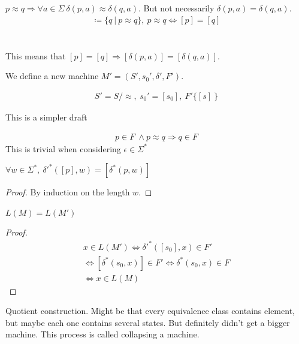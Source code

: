 \documentclass[../598comp.tex]{subfiles}
\begin{document}
\begin{lemma}
  $p \approx q \Rightarrow \forall a \in \Sigma \ \delta(p, a) \approx \delta(q, a)$. But not necessarily $\delta(p, a) = \delta(q, a)$.
  \begin{gather*}
    [p] \coloneqq \{q \ | \ p \approx q\}, \ p \approx q \Leftrightarrow [p] = [q]
  \end{gather*} 
  \\\\
  This means that $[p] = [q] \Rightarrow [\delta(p, a)] = [\delta(q, a)]$.
\end{lemma} 

We define a new machine $M' = (S', s_0', \delta', F')$. 

\begin{gather*}
  S' = S / \approx, \ s_0' = [s_0], \ F'\{[s] \ \} %
\end{gather*} 


This is a simpler draft

\begin{lemma}
  \begin{gather*}
   p \in F \ \wedge p \approx q \Rightarrow q \in F
  \end{gather*} 
  This is trivial when considering $\epsilon \in \Sigma^*$
\end{lemma} 

\begin{lemma}
  $\forall w \in \Sigma^*, \ \delta'^*([p], w) = [\delta^*(p, w)]$
  \begin{proof}
    By induction on the length $w$.
  \end{proof}
\end{lemma} 

\begin{theorem}
  $L(M) = L(M')$
  \begin{proof}
    \begin{gather*}
      x \in L(M') \Leftrightarrow \delta'^*([s_0], x) \in F' \\
      \Leftrightarrow [\delta^*(s_0, x)] \in F' \Leftrightarrow \delta^*(s_0, x) \in F \\
      \Leftrightarrow x \in L(M)
    \end{gather*} 
  \end{proof} 
  Quotient construction. Might be that every equivalence class contains element, but maybe each one contains several states. But definitely didn't get a bigger machine. This process is called collapsing a machine.
\end{theorem} 
\end{document}
